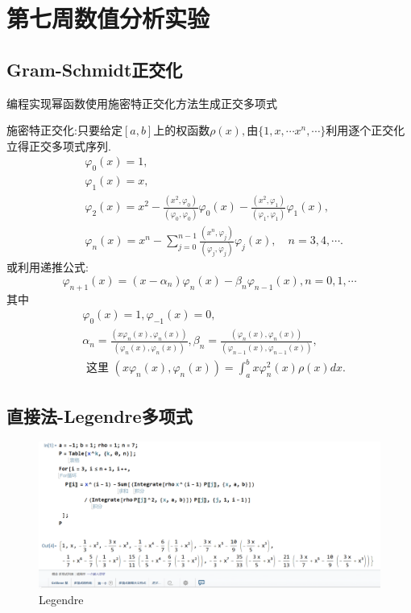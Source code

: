 \section{第七周数值分析实验}
\subsection{Gram-Schmidt正交化}
\begin{ex}
	编程实现幂函数使用施密特正交化方法生成正交多项式
	
	施密特正交化:只要给定$[a,b]$上的权函数$\rho \left( x \right),$由$\{1,x,\cdots x^n,\cdots \}$利用逐个正交化立得正交多项式序列.
	$$
	\begin{aligned}
		& \varphi_0(x)=1, \\
		& \varphi_1(x)=x, \\
		& \varphi_2(x)=x^2-\frac{\left(x^2, \varphi_0\right)}{\left(\varphi_0, \varphi_0\right)} \varphi_0(x)-\frac{\left(x^2, \varphi_1\right)}{\left(\varphi_1, \varphi_1\right)} \varphi_1(x), \\
		& \varphi_n(x)=x^n-\sum_{j=0}^{n-1} \frac{\left(x^n, \varphi_j\right)}{\left(\varphi_j, \varphi_j\right)} \varphi_j(x), \quad n=3,4, \cdots .
	\end{aligned}
	$$
	或利用递推公式:
	$$
	\varphi_{n+1}(x)=\left(x-\alpha_n\right) \varphi_n(x)-\beta_n \varphi_{n-1}(x), n=0,1, \cdots
	$$
	其中
	$$
	\begin{aligned}
		& \varphi_0(x)=1, \varphi_{-1}(x)=0, \\
		& \alpha_n=\frac{\left(x \varphi_n(x), \varphi_n(x)\right)}{\left(\varphi_n(x), \varphi_n(x)\right)}, \beta_n=\frac{\left(\varphi_n(x), \varphi_n(x)\right)}{\left(\varphi_{n-1}(x), \varphi_{n-1}(x)\right)}, \\
		& \text { 这里 }\left(x \varphi_n(x), \varphi_n(x)\right)=\int_a^b x \varphi_n^2(x) \rho(x) d x .
	\end{aligned}
	$$
\end{ex}
%
\subsection{直接法-Legendre多项式}

\begin{figure}[H]
	\centering
	\includegraphics[width = 1\linewidth]{day6/fig1.png}
	\caption{Legendre}
\end{figure}
